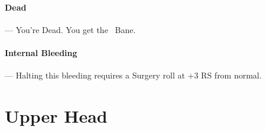 \documentclass[oneside,11pt,english]{book}
\begin{document}
\vspace{-5pt}\paragraph{\label{par:Dead}Dead}---\quad
You’re Dead. You get the ~Bane.

\vspace{-5pt}\paragraph{\label{par:Internal Bleeding}Internal Bleeding}---\quad
Halting this bleeding requires a Surgery roll at +3 RS from normal.
\newpage
		\captionsetup{font=small} %
\section{Upper Head}\label{sec:upper-head}
\end{document}
